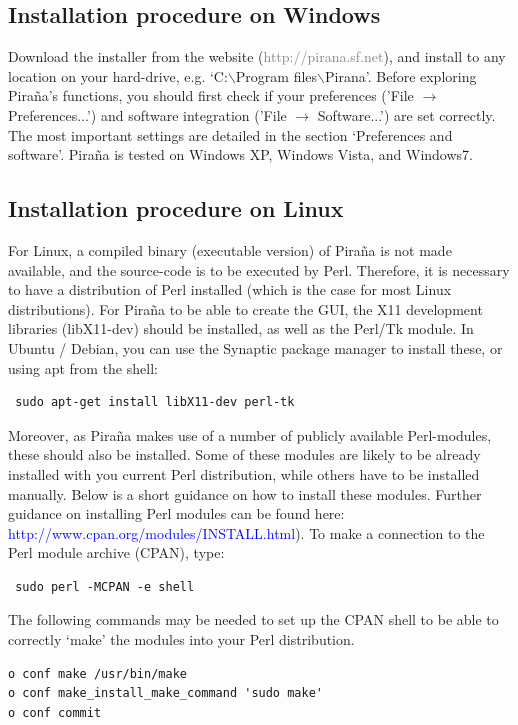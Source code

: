 \documentclass[a4,11pt]{report} \usepackage[pdftex]{graphicx}
\begin{document}
\subsection{Installation procedure on Windows} Download the installer
from the website (\textcolor{Grey}{http://pirana.sf.net}), and install
to any location on your hard-drive, e.g. `C:$\backslash$Program
files$\backslash$Pirana'. Before exploring Pira\~na's functions, you
should first check if your preferences ('File $\rightarrow$
Preferences...') and software integration ('File $\rightarrow$
Software...') are set correctly. The most important settings are
detailed in the section `Preferences and software'. Pira\~na is tested
on Windows XP, Windows Vista, and Windows7.

\subsection{Installation procedure on Linux} For Linux, a compiled
binary (executable version) of Pira\~na is not made available, and the
source-code is to be executed by Perl. Therefore, it is necessary to
have a distribution of Perl installed (which is the case for most
Linux distributions). For Pira\~na to be able to create the GUI, the
X11 development libraries (libX11-dev) should be installed, as well as
the Perl/Tk module. In Ubuntu / Debian, you can use the Synaptic package
manager to install these, or using apt from the shell:

\begin{verbatim} sudo apt-get install libX11-dev perl-tk
\end{verbatim}

\noindent Moreover, as Pira\~na makes use of a number of publicly
available Perl-modules, these should also be installed. Some of these
modules are likely to be already installed with you current Perl
distribution, while others have to be installed manually. Below is a
short guidance on how to install these modules. Further guidance on
installing Perl modules can be found here: \textcolor{Blue}{
http://www.cpan.org/modules/INSTALL.html}). To make a connection to
the Perl module archive (CPAN), type:
\begin{verbatim} sudo perl -MCPAN -e shell
\end{verbatim}

\noindent The following commands may be needed to set up the CPAN
shell to be able to correctly `make' the modules into your Perl distribution.
\begin{verbatim}
o conf make /usr/bin/make
o conf make_install_make_command 'sudo make'
o conf commit
\end{verbatim}
\end{document}
